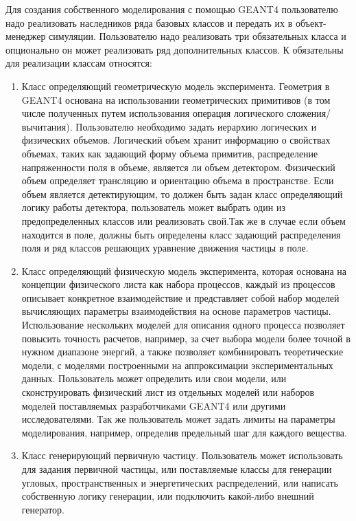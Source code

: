 Для создания собственного моделирования с помощью GEANT4 пользователю надо реализовать наследников ряда базовых классов и передать их в объект-менеджер симуляции. Пользователю надо реализовать три обязательных класса и опционально он может реализовать ряд дополнительных классов. К обязательны для реализации классам относятся: 
\begin{enumerate}
    \item  Класс определяющий геометрическую модель эксперимента. Геометрия в GEANT4 основана на использовании геометрических примитивов (в том числе полученных путем использования операция логического сложения/вычитания). Пользователю необходимо задать иерархию логических и физических объемов. Логический объем хранит информацию о свойствах объемах, таких как задающий форму объема примитив, распределение напряженности поля в объеме, является ли объем детектором. Физический объем определяет трансляцию и ориентацию объема в пространстве. Если объем является детектирующим, то должен быть задан класс определяющий логику работы детектора, пользователь может выбрать один из предопределенных классов или реализовать свой.Так же в случае если объем находится в поле, должны быть определены класс задающий распределения поля и ряд классов решающих уравнение движения частицы в поле.
    \item Класс определяющий физическую модель эксперимента, которая основана на концепции физического листа как набора процессов, каждый  из процессов описывает конкретное взаимодействие и представляет собой набор моделей вычисляющих параметры взаимодействия на основе параметров частицы. Использование нескольких моделей для описания одного процесса позволяет повысить точность расчетов, например, за счет выбора модели более точной в нужном диапазоне энергий, а также позволяет комбинировать теоретические модели, с моделями построенными на аппроксимации экспериментальных данных. Пользователь может определить или свои модели, или сконструировать физический лист из отдельных моделей или наборов моделей поставляемых разработчиками GEANT4 или другими исследователями. Так же пользователь может задать лимиты на параметры моделирования, например, определив предельный шаг для каждого вещества.
    \item Класс генерирующий первичную частицу. Пользователь может использовать для задания первичной частицы, или поставляемые классы для генерации угловых, пространственных и энергетических распределений, или написать собственную логику генерации, или подключить какой-либо внешний генератор.  
\end{enumerate}
